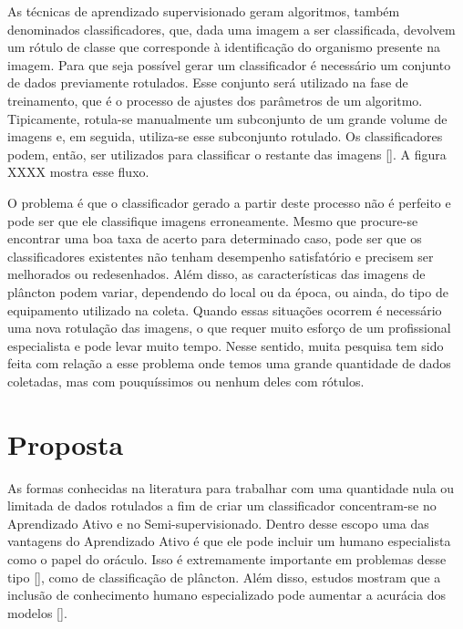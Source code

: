 As técnicas de aprendizado supervisionado geram algoritmos, também denominados classificadores, que, dada uma imagem a ser classificada, devolvem um rótulo de classe que corresponde à identificação do organismo presente na imagem. Para que seja possível gerar um classificador é necessário um conjunto de dados previamente rotulados. Esse conjunto será utilizado na fase de treinamento, que é o processo de ajustes dos parâmetros de um algoritmo. Tipicamente, rotula-se manualmente um subconjunto de um grande volume de imagens e, em seguida, utiliza-se esse subconjunto rotulado. Os classificadores podem, então, ser utilizados para classificar o restante das imagens [\cite{jeffries1980computer, jeffries1984automated, berman1990image, tang1998automatic}]. A figura XXXX mostra esse fluxo. 


O problema é que o classificador gerado a partir deste processo não é perfeito e pode ser que ele classifique imagens erroneamente. Mesmo que procure-se encontrar uma boa taxa de acerto para determinado caso, pode ser que os classificadores existentes não tenham desempenho satisfatório e precisem ser melhorados ou redesenhados. Além disso, as características das imagens de plâncton podem variar, dependendo do local ou da época, ou ainda, do tipo de equipamento utilizado na coleta. Quando essas situações ocorrem é necessário uma nova rotulação das imagens, o que requer muito esforço de um profissional especialista e pode levar muito tempo. Nesse sentido, muita pesquisa tem sido feita com relação a esse problema onde temos uma grande quantidade de dados coletadas, mas com pouquíssimos ou nenhum deles com rótulos. 



\section{Proposta}
\label{sec:intro_proposta}


As formas conhecidas na literatura para trabalhar com uma quantidade nula ou limitada de dados rotulados a fim de criar um classificador concentram-se no Aprendizado Ativo e no Semi-supervisionado. Dentro desse escopo uma das vantagens do Aprendizado Ativo é que ele pode incluir um humano especialista como o papel do oráculo. Isso é extremamente importante em problemas desse tipo [\cite{saito2014active}], como de classificação de plâncton. Além disso, estudos mostram que a inclusão de conhecimento humano especializado pode aumentar a acurácia dos modelos [\cite{benfield2007rapid}].

